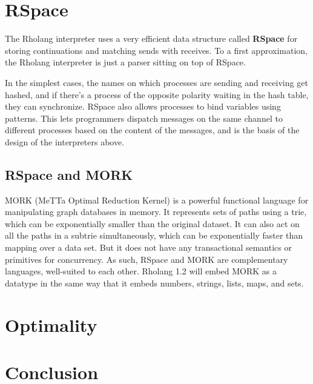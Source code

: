 \documentclass{article}
\begin{document}
\section{RSpace}

The Rholang interpreter uses a very efficient data structure called \textbf{RSpace} for storing continuations and matching sends with receives.  To a first approximation, the Rholang interpreter is just a parser sitting on top of RSpace.

In the simplest cases, the names on which processes are sending and receiving get hashed, and if there's a process of the opposite polarity waiting in the hash table, they can synchronize.  RSpace also allows processes to bind variables using patterns.  This lets programmers dispatch messages on the same channel to different processes based on the content of the messages, and is the basis of the design of the interpreters above.

\subsection{RSpace and MORK}

MORK (MeTTa Optimal Reduction Kernel) is a powerful functional language for manipulating graph databases in memory. It represents sets of paths using a trie, which can be exponentially smaller than the original dataset.  It can also act on all the paths in a subtrie simultaneously, which can be exponentially faster than mapping over a data set.  But it does not have any transactional semantics or primitives for concurrency.  As such, RSpace and MORK are complementary languages, well-suited to each other.  Rholang 1.2 will embed MORK as a datatype in the same way that it embeds numbers, strings, lists, maps, and sets.  

\section{Optimality}


\section{Conclusion}
\end{document}
